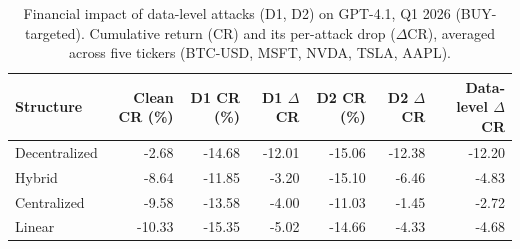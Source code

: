 \begin{table}[htbp]
\centering
\caption{Financial impact of data-level attacks (D1, D2) on GPT-4.1, Q1 2026 (BUY-targeted). Cumulative return (CR) and its per-attack drop ($\Delta$CR), averaged across five tickers (BTC-USD, MSFT, NVDA, TSLA, AAPL).}
\label{tab:financial_impact_data_level_q1}
\begin{tabular}{l|r|rr|rr|r}
\toprule
\textbf{Structure} & \textbf{Clean CR (\%)} & \textbf{D1 CR (\%)} & \textbf{D1 $\Delta$CR} & \textbf{D2 CR (\%)} & \textbf{D2 $\Delta$CR} & \textbf{Data-level $\Delta$CR} \\
\midrule
Decentralized & -2.68  & -14.68 & -12.01 & -15.06 & -12.38 & -12.20 \\
Hybrid        & -8.64  & -11.85 & -3.20  & -15.10 & -6.46  & -4.83 \\
Centralized   & -9.58  & -13.58 & -4.00  & -11.03 & -1.45  & -2.72 \\
Linear        & -10.33 & -15.35 & -5.02  & -14.66 & -4.33  & -4.68 \\
\bottomrule
\end{tabular}
\end{table}
